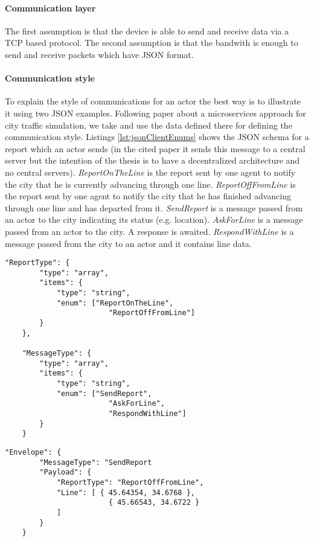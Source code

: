 \documentclass[a4paper,12pt,twoside]{book}
\begin{document}
    \paragraph{Communication layer} The first assumption is that the device is able to send and receive data via a TCP based protocol. The second assumption is that the bandwith is enough to send and receive packets which have JSON format.

    \paragraph{Communication style} To explain the style of communications for an actor the best way is to illustrate it using two JSON examples. Following \cite{MicroservicesCityTrafficSimulation} paper about a microservices approach for city traffic simulation, we take and use the data defined there for defining the communication style. Listings \ref{lst:jsonClientEnums} shows the JSON schema for a report which an actor sends (in the cited paper it sends this message to a central server but the intention of the thesis is to have a decentralized architecture and no central servers). \textit{ReportOnTheLine} is the report sent by one agent to notify the city that he is currently advancing through one line. \textit{ReportOffFromLine} is the report sent by one agent to notify the city that he has finished advancing through one line and has departed from it. \textit{SendReport} is a message passed from an actor to the city indicating its status (e.g. location). \textit{AskForLine} is a message passed from an actor to the city. A response is awaited. \textit{RespondWithLine} is a message passed from the city to an actor and it contains line data.

    \begin{lstlisting}[caption=JSON schema with enumerations for messaging, label=lst:jsonClientEnums]
    "ReportType": {
        "type": "array",
        "items": {
            "type": "string",
            "enum": ["ReportOnTheLine", 
                        "ReportOffFromLine"]
        }
    },
    
    "MessageType": {
        "type": "array",
        "items": {
            "type": "string",
            "enum": ["SendReport",
                        "AskForLine", 
                        "RespondWithLine"]
        }
    }            
    \end{lstlisting}

    \begin{lstlisting}[caption=JSON top level struct (envelope), label=lst:jsonEnvelope]        
    "Envelope": {
        "MessageType": "SendReport
        "Payload": {
            "ReportType": "ReportOffFromLine",
            "Line": [ { 45.64354, 34.6768 }, 
                        { 45.66543, 34.6722 }
            ]
        }
    }
    \end{lstlisting}
\end{document}
